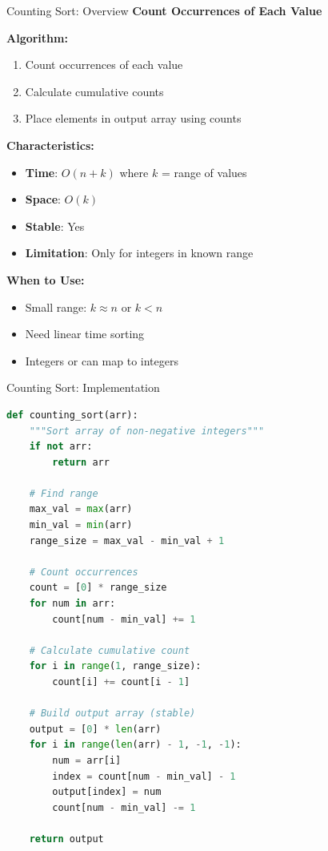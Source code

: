 \documentclass[aspectratio=169]{beamer}
\begin{document}
\begin{frame}{Counting Sort: Overview}
  \textbf{Count Occurrences of Each Value}

  \vspace{0.3cm}
  \textbf{Algorithm:}
  \begin{enumerate}
    \item Count occurrences of each value
    \item Calculate cumulative counts
    \item Place elements in output array using counts
  \end{enumerate}

  \vspace{0.3cm}
  \textbf{Characteristics:}
  \begin{itemize}
    \item \textbf{Time}: $O(n + k)$ where $k$ = range of values
    \item \textbf{Space}: $O(k)$
    \item \textbf{Stable}: Yes
    \item \textbf{Limitation}: Only for integers in known range
  \end{itemize}

  \vspace{0.3cm}
  \textbf{When to Use:}
  \begin{itemize}
    \item Small range: $k \approx n$ or $k < n$
    \item Need linear time sorting
    \item Integers or can map to integers
  \end{itemize}
\end{frame}

\begin{frame}[fragile]{Counting Sort: Implementation}
\begin{lstlisting}[language=Python, basicstyle=\ttfamily\tiny]
def counting_sort(arr):
    """Sort array of non-negative integers"""
    if not arr:
        return arr

    # Find range
    max_val = max(arr)
    min_val = min(arr)
    range_size = max_val - min_val + 1

    # Count occurrences
    count = [0] * range_size
    for num in arr:
        count[num - min_val] += 1

    # Calculate cumulative count
    for i in range(1, range_size):
        count[i] += count[i - 1]

    # Build output array (stable)
    output = [0] * len(arr)
    for i in range(len(arr) - 1, -1, -1):
        num = arr[i]
        index = count[num - min_val] - 1
        output[index] = num
        count[num - min_val] -= 1

    return output
\end{lstlisting}
\end{frame}
\end{document}
